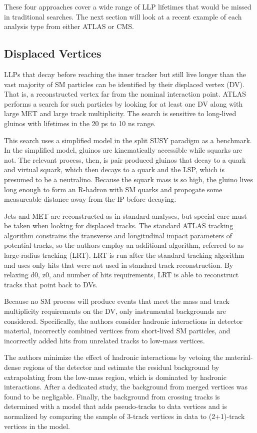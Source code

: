 \documentclass[12pt]{article}
\begin{document}
        These four approaches cover a wide range of LLP lifetimes that would be missed in traditional searches. The next section will look  at a recent example of each analysis type from either ATLAS or CMS.

\subsection{Displaced Vertices}
            LLPs that decay before reaching the inner tracker but still live longer than the vast majority of SM particles can be identified by their displaced vertex (DV). That is, a reconstructed vertex far from the nominal interaction point. ATLAS performs a search for such particles by looking for at least one DV along with large MET and large track multiplicity. The search is sensitive to long-lived gluinos with lifetimes in the 20 ps to 10 ns range.

            This search uses a simplified model in the split SUSY paradigm as a benchmark. In the simplified model, gluinos are kinematically accessible while squarks are not. The relevant process, then, is pair produced gluinos that decay to a quark and virtual squark, which then decays to a quark and the LSP, which is presumed to be a neutralino. Because the squark mass is so high, the gluino lives long enough to form an R-hadron with SM quarks and propogate some measureable distance away from the IP before decaying. 

            Jets and MET are reconstructed as in standard analyses, but special care must be taken when looking for displaced tracks. The standard ATLAS tracking algorithm constrains the transverse and longitudinal impact parameters of potential tracks, so the authors employ an additional algorithm, referred to as large-radius tracking (LRT). LRT is run after the standard tracking algorithm and uses only hits that were not used in standard track reconstruction. By relaxing d0, z0, and number of hits requirements, LRT is able to reconstruct tracks that point back to DVs.
            
            Because no SM process will produce events that meet the mass and track multiplicity requirements on the DV, only instrumental backgrounds are considered. Specifically, the authors consider hadronic interactions in detector material, incorrectly combined vertices from short-lived SM particles, and incorrectly added hits from unrelated tracks to low-mass vertices.

            The authors minimize the effect of hadronic interactions by vetoing the material-dense regions of the detector and estimate the residual background by extrapolating from the low-mass region, which is dominated by hadronic interactions. After a dedicated study, the background from merged vertices was found to be negligable. Finally, the background from crossing tracks is determined with a model that adds pseudo-tracks to data vertices and is normalized by comparing the sample of 3-track vertices in data to (2+1)-track vertices in the model.
\end{document}
